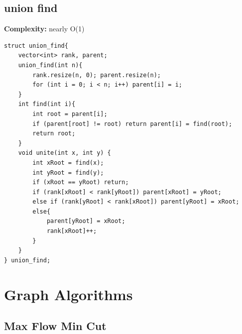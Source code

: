 \documentclass[10pt,a4paper]{article}
\begin{document}
\subsection{union find}

\textbf{Complexity:} nearly O(1)
\begin{verbatim}
struct union_find{
    vector<int> rank, parent;
    union_find(int n){
        rank.resize(n, 0); parent.resize(n);
        for (int i = 0; i < n; i++) parent[i] = i;
    }
    int find(int i){
        int root = parent[i];
        if (parent[root] != root) return parent[i] = find(root);
        return root;
    }
    void unite(int x, int y) {
        int xRoot = find(x);
        int yRoot = find(y);
        if (xRoot == yRoot) return;
        if (rank[xRoot] < rank[yRoot]) parent[xRoot] = yRoot;
        else if (rank[yRoot] < rank[xRoot]) parent[yRoot] = xRoot;
        else{
            parent[yRoot] = xRoot;
            rank[xRoot]++;
        }
    }
} union_find;
\end{verbatim}

\section{Graph Algorithms}

\subsection{Max Flow Min Cut}
\end{document}
